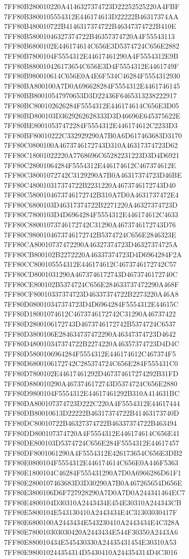 7FF80B280010220A4146327374723D22252525220A4FBF
7FF80B3800105554312E446174613D22222B46317374AA
7FF80B480010722B4146317374722B46347374722B410E
7FF80B58001046327374722B46357374720A4F55543113
7FF80B6800102E446174614C656E3D5374724C656E2882
7FF80B7800104F5554312E44617461290A4F5554312E9B
7FF80B880010426173654C656E3D4F5554312E4461749F
7FF80B980010614C656E0A4E6F534C46284F5554312930
7FF80BA800100A7D0A696628284F5554312E4461746145
7FF80BB80010547970653D3D22436F6465313238222917
7FF80BC800102626284F5554312E446174614C656E3D05
7FF80BD800103D3629262628333D3D46696E645375622E
7FF80BE80010537472284F5554312E446174612C2233D3
7FF80BF80010222C332929290A7B0A6D617463683D3170
7FF80C0800100A4673746172743D310A46317374723D62
7FF80C18001022220A7768696C65282231223D3D4D6921
7FF80C28001064284F5554312E446174612C467374612E
7FF80C38001072742C3129290A7B0A46317374723D46BE
7FF80C480010317374722B2231220A4673746172743D40
7FF80C5800104673746172742B310A7D0A4631737472E4
7FF80C6800103D46317374722B2271220A46327374723D
7FF80C7800103D4D6964284F5554312E446174612C4633
7FF80C88001073746172742C31290A4673746172743D76
7FF80C9800104673746172742B5374724C656E2846323E
7FF80CA80010737472290A46327374723D46327374725A
7FF80CB800102B2272220A46337374723D4D6964284F2A
7FF80CC800105554312E446174612C4673746172742C57
7FF80CD8001031290A4673746172743D4673746172740C
7FF80CE800102B5374724C656E284633737472290A468F
7FF80CF80010337374723D46337374722B2273220A46A8
7FF80D080010347374723D4D6964284F5554312E44615C
7FF80D18001074612C4673746172742C31290A46737422
7FF80D2800106172743D4673746172742B5374724C6537
7FF80D3800106E284634737472290A46347374723D4642
7FF80D480010347374722B2274220A46357374723D4D4C
7FF80D5800106964284F5554312E446174612C467374F5
7FF80D6800106172742C285374724C656E284F555431C0
7FF80D7800102E44617461292D467374617274292B31FD
7FF80D880010290A4673746172743D5374724C656E2880
7FF80D9800104F5554312E44617461292B310A414631BC
7FF80DA800107374723D222C220A4F5554312E44617444
7FF80DB80010613D22222B46317374722B41463173740D
7FF80DC80010722B46327374722B46337374722B463494
7FF80DD800107374720A4F5554312E446174614C656E41
7FF80DE800103D5374724C656E284F5554312E44617457
7FF80DF8001061290A4F5554312E426173654C656E3DB2
7FF80E0800104F5554312E446174614C656E0A446F5363
7FF80E1800104C46284F555431290A7D0A6966286D61F1
7FF80E2800107463683D3D30290A7B0A467265654D656E
7FF80E3800106D6F727928290A7D0A7D0A244341464EC7
7FF80E4800104D30310A2443434E454E30310A244343CB
7FF80E5800104E543130410A2443434E4C31303030417F
7FF80E6800100A2443434E543230410A2443434E4C328A
7FF80E780010303030420A2443434E544F30350A2443A6
7FF80E880010434E545430330A24435431454E30310A53
7FF80E980010244354314D5430410A244354314D4C3016
